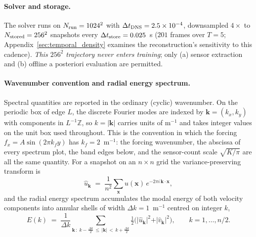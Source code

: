 \paragraph{Solver and storage.}
The solver runs on $N_{\rm run}=1024^2$ with $\Delta t_{\rm DNS}=2.5\times 10^{-4}$, downsampled $4\times$ to $N_{\rm stored}=256^2$ snapshots every $\Delta t_{\rm store}=0.025$~s ($201$ frames over $T=5$; Appendix~\ref{sec:temporal_density} examines the reconstruction's sensitivity to this cadence). \emph{This $256^2$ trajectory never enters training}; only (a) sensor extraction and (b) offline a posteriori evaluation are permitted.

\paragraph{Wavenumber convention and radial energy spectrum.}
\label{subsec:spectrum_definition}
Spectral quantities are reported in the ordinary (cyclic) wavenumber. On the periodic box of edge $L$, the discrete Fourier modes are indexed by $\mathbf{k}=(k_x,k_y)$ with components in $L^{-1}\mathbb{Z}$, so $k=\vert\mathbf{k}\vert$ carries units of $\mathrm{m}^{-1}$ and takes integer values on the unit box used throughout. This is the convention in which the forcing $f_x = A\sin(2\pi k_f y)$ has $k_f = 2$~m$^{-1}$: the forcing wavenumber, the abscissa of every spectrum plot, the band edges below, and the sensor-count scale $\sqrt{K/\pi}$ are all the same quantity. For a snapshot on an $n\times n$ grid the variance-preserving transform is
\begin{equation}
    \hat{u}_{\mathbf{k}} \;=\; \frac{1}{n^2}\sum_{\mathbf{x}} u(\mathbf{x})\,e^{-2\pi i\,\mathbf{k}\cdot\mathbf{x}},
    \label{eq:fft_norm}
\end{equation}
and the radial energy spectrum accumulates the modal energy of both velocity components into annular shells of width $\Delta k = 1$~m$^{-1}$ centred on integer $k$,
\begin{equation}
    E(k) \;=\; \frac{1}{\Delta k}\sum_{\mathbf{k}\,:\;k-\frac{\Delta k}{2}\,\le\,\vert\mathbf{k}\vert\,<\,k+\frac{\Delta k}{2}} \tfrac{1}{2}\Big(\vert\hat{u}_{\mathbf{k}}\vert^2 + \vert\hat{v}_{\mathbf{k}}\vert^2\Big),
    \qquad k = 1,\dots,n/2 .
    \label{eq:radial_spectrum}
\end{equation}

